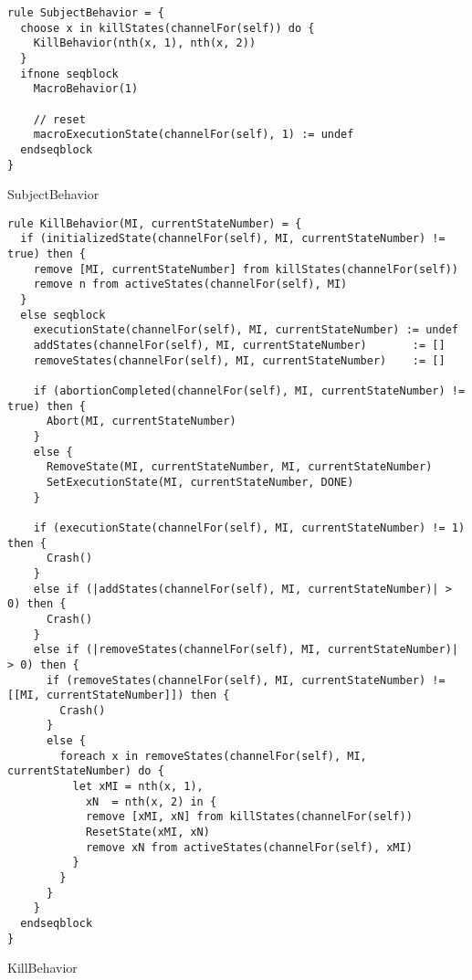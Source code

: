 \begin{listing}[H]
\begin{verbatim}
rule SubjectBehavior = {
  choose x in killStates(channelFor(self)) do {
    KillBehavior(nth(x, 1), nth(x, 2))
  }
  ifnone seqblock
    MacroBehavior(1)

    // reset
    macroExecutionState(channelFor(self), 1) := undef
  endseqblock
}
\end{verbatim}
\caption{SubjectBehavior}
\label{lst:asm:SubjectBehavior}
\end{listing}




\begin{listing}[H]
\begin{verbatim}
rule KillBehavior(MI, currentStateNumber) = {
  if (initializedState(channelFor(self), MI, currentStateNumber) != true) then {
    remove [MI, currentStateNumber] from killStates(channelFor(self))
    remove n from activeStates(channelFor(self), MI)
  }
  else seqblock
    executionState(channelFor(self), MI, currentStateNumber) := undef
    addStates(channelFor(self), MI, currentStateNumber)       := []
    removeStates(channelFor(self), MI, currentStateNumber)    := []

    if (abortionCompleted(channelFor(self), MI, currentStateNumber) != true) then {
      Abort(MI, currentStateNumber)
    }
    else {
      RemoveState(MI, currentStateNumber, MI, currentStateNumber)
      SetExecutionState(MI, currentStateNumber, DONE)
    }

    if (executionState(channelFor(self), MI, currentStateNumber) != 1) then {
      Crash()
    }
    else if (|addStates(channelFor(self), MI, currentStateNumber)| > 0) then {
      Crash()
    }
    else if (|removeStates(channelFor(self), MI, currentStateNumber)| > 0) then {
      if (removeStates(channelFor(self), MI, currentStateNumber) != [[MI, currentStateNumber]]) then {
        Crash()
      }
      else {
        foreach x in removeStates(channelFor(self), MI, currentStateNumber) do {
          let xMI = nth(x, 1),
            xN  = nth(x, 2) in {
            remove [xMI, xN] from killStates(channelFor(self))
            ResetState(xMI, xN)
            remove xN from activeStates(channelFor(self), xMI)
          }
        }
      }
    }
  endseqblock
}
\end{verbatim}
\caption{KillBehavior}
\label{lst:asm:KillBehavior}
\end{listing}




